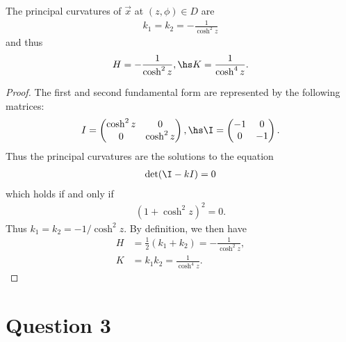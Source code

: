 \documentclass{article}
\begin{document}
\begin{claim*}
   The principal curvatures of $\vec x$ at $(z,\phi)\in D$ are 
   \begin{align*}
      k_1 = k_2 = -\frac{1}{\cosh^2 z}
   \end{align*}
   and thus 
   \begin{align*}
      H=-\frac{1}{\cosh^2 z},\hs K=\frac{1}{\cosh^4 z}.
   \end{align*}
\end{claim*}
\begin{proof}
   The first and second fundamental form are represented by the following 
   matrices:
   \begin{align*}
      I = \begin{pmatrix}
         \cosh^2 z & 0 \\ 0 & \cosh^2 z
      \end{pmatrix}, \hs 
      \I = \begin{pmatrix}
         -1 & 0 \\ 0 & -1
      \end{pmatrix}.
   \end{align*}
   Thus the principal curvatures are the solutions to the equation
   \begin{align*}
      \det(\I-kI)=0
   \end{align*}
   which holds if and only if 
   \begin{align*}
      (1+\cosh^2 z)^2 = 0.
   \end{align*}
   Thus $k_1=k_2=-1/\cosh^2 z$.
   By definition, we then have 
   \begin{align*}
      H&=\frac{1}{2}(k_1+k_2)=-\frac{1}{\cosh^2 z},\\
      K&=k_1k_2=\frac{1}{\cosh^4 z}.
   \end{align*}
\end{proof}

\section*{Question 3}
\end{document}
